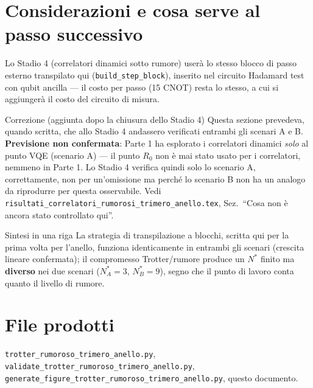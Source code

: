 \documentclass[11pt,a4paper]{article}
\begin{document}
\section{Considerazioni e cosa serve al passo successivo}

Lo Stadio 4 (correlatori dinamici sotto rumore) userà lo stesso blocco
di passo esterno transpilato qui (\texttt{build\_step\_block}), inserito
nel circuito Hadamard test con qubit ancilla --- il costo per passo (15
CNOT) resta lo stesso, a cui si aggiungerà il costo del circuito di
misura.

\begin{okbox}{Correzione (aggiunta dopo la chiusura dello Stadio 4)}
Questa sezione prevedeva, quando scritta, che allo Stadio 4 andassero
verificati entrambi gli scenari A e B. \textbf{Previsione non
confermata}: Parte 1 ha esplorato i correlatori dinamici \emph{solo} al
punto VQE (scenario A) --- il punto $R_0$ non è mai stato usato per i
correlatori, nemmeno in Parte 1. Lo Stadio 4 verifica quindi solo lo
scenario A, correttamente, non per un'omissione ma perché lo scenario B
non ha un analogo da riprodurre per questa osservabile. Vedi
\texttt{risultati\_\allowbreak correlatori\_\allowbreak rumorosi\_trimero\_anello.tex},
Sez.\ ``Cosa non è ancora stato controllato qui''.
\end{okbox}

\begin{okbox}{Sintesi in una riga}
La strategia di transpilazione a blocchi, scritta qui per la prima volta
per l'anello, funziona identicamente in entrambi gli scenari (crescita
lineare confermata); il compromesso Trotter/rumore produce un $N^*$
finito ma \textbf{diverso} nei due scenari ($N^*_A=3$, $N^*_B=9$),
segno che il punto di lavoro conta quanto il livello di rumore.
\end{okbox}

\section*{File prodotti}

\texttt{trotter\_\allowbreak rumoroso\_trimero\_anello.py},
\texttt{validate\_\allowbreak trotter\_\allowbreak rumoroso\_trimero\_anello.py},
\texttt{generate\_figure\_\allowbreak trotter\_\allowbreak rumoroso\_trimero\_anello.py},
questo documento.
\end{document}
